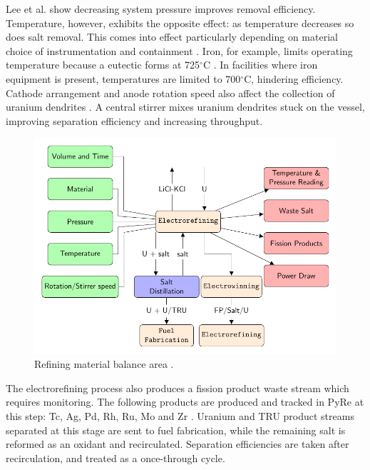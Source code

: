 Lee et al. \cite{lee_advanced_2008} show decreasing system pressure improves removal efficiency. 
Temperature, however, exhibits the opposite effect: as temperature decreases so does salt removal. This comes into effect 
particularly depending on material choice of instrumentation and containment \cite{lee_advanced_2008}. 
Iron, for example, limits operating temperature because a eutectic forms at 725$^{\circ}$C \cite{chapman_revision_1984}.
In facilities where iron equipment is present, temperatures are limited to 700$^{\circ}$C, hindering efficiency. 
Cathode arrangement and anode rotation speed also affect the collection of uranium 
dendrites \cite{lee_advanced_2008}. A central stirrer mixes uranium dendrites stuck on 
the vessel, improving separation efficiency and increasing throughput. 

\begin{figure}[h]
	\centering
	\includegraphics[width=0.85\linewidth]{images/refining}
	\caption{Refining material balance area \cite{lee_advanced_2008}.}
	\label{fig:refining}
\end{figure}

The electrorefining process also produces a fission product waste stream which requires monitoring. 
The following products are produced and tracked in \gls{PyRe} at this step: Tc, Ag, Pd, Rh, Ru, Mo and Zr \cite{flowsheet_1998}. 
Uranium and \gls{TRU} product streams separated at this stage are sent to fuel fabrication, while the remaining salt is reformed as an oxidant and recirculated.
Separation efficiencies are taken after recirculation, and treated as a once-through cycle. 


